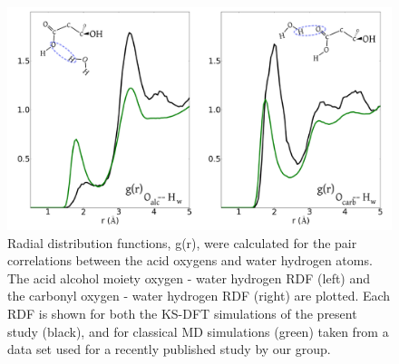 \begin{figure}[h!]
	\begin{center}
		\includegraphics[scale=1.0]{images/rdf/MalonicRDF-small.png}
		\caption{Radial distribution functions, g(r), were calculated for the pair correlations between the acid oxygens and water hydrogen atoms. The acid alcohol moiety oxygen - water hydrogen RDF (left) and the carbonyl oxygen - water hydrogen RDF (right) are plotted. Each RDF is shown for both the KS-DFT simulations of the present study (black), and for classical MD simulations (green) taken from a data set used for a recently published study by our group.\cite{Blower2012}}
		\label{fig:rdf}
	\end{center}
\end{figure}
